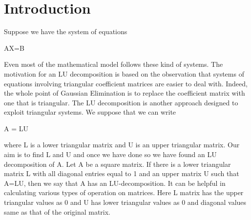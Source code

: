 \documentclass{sem5}
\author{Dilip Puri}
\begin{document}
\section{Introduction}
Suppose we have the system of equations
\begin{center}AX=B\end{center}
Even most of the mathematical model follows these kind of systems. The motivation for an LU decomposition is based on the observation that systems of equations involving triangular coefficient matrices are easier to deal with.  Indeed, the whole point of Gaussian Elimination is to replace the coefficient matrix with one that is triangular.  The LU decomposition is another approach designed to exploit triangular systems. We suppose that we can write
\begin{center}A = LU\end{center}
where L is a lower triangular matrix and U is an upper triangular matrix. Our aim is to find L and U and once we have done so we have found an LU decomposition of A.
Let A be a square matrix. If there is a lower triangular matrix L with all diagonal entries equal to 1 and an upper matrix U such that A=LU, then we say that A has an LU-decomposition. It can be helpful in calculating various types of operation on matrices. Here L matrix has the upper triangular values as 0 and U has lower triangular values as 0 and diagonal values same as that of the original matrix. 

\newpage
\end{document}
